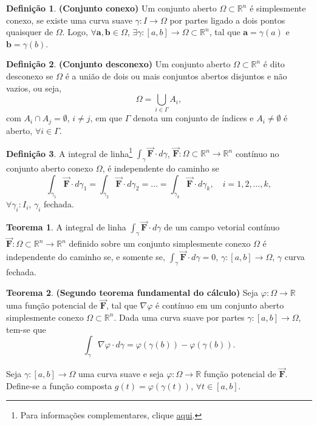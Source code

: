 \documentclass[11pt]{article}
\theoremstyle{definition}
\newtheorem{definicao}{Definição}
\newtheorem{teorema}{Teorema}
\begin{document}
	\begin{definicao} \textbf{(Conjunto conexo)}
		Um conjunto aberto $\Omega\subset \mathbb{R}^n$ é simplesmente conexo, se existe uma curva suave $\gamma:I \to \Omega$ por partes ligado a dois pontos quaisquer de $\Omega$. Logo, $\forall \boldsymbol{a}, \boldsymbol{b}  \in \Omega$, $\exists \gamma:[a,b] \to \Omega \subset \mathbb{R}^n$, tal que $\boldsymbol{a}=\gamma(a)$ e $\boldsymbol{b}=\gamma(b)$.
	\end{definicao}
	\begin{definicao} \textbf{(Conjunto desconexo)}
		Um conjunto aberto $\Omega \subset \mathbb{R}^n$ é dito desconexo se $\Omega$ é a união de dois ou mais conjuntos abertos disjuntos e não vazios, ou seja,
		\begin{equation*}
			\Omega=\bigcup_{i \in \Gamma}A_i,
		\end{equation*}
		com $A_i\cap A_j = \emptyset$, $i \neq j$, em que $\Gamma$ denota um conjunto de índices e $A_i\neq \emptyset$ é aberto, $\forall i \in \Gamma$.
	\end{definicao}
	\begin{definicao}
		A integral de linha\footnote{Para informações complementares, clique \href{https://github.com/caio-nicacio/studyNotes/blob/main/calculus-topics/line-integrals/line-integrals.pdf}{aqui}.} $\int_{\gamma} \vec{\boldsymbol{F}}\cdot d\gamma$, $\vec{\boldsymbol{F}}:\Omega \subset \mathbb{R}^n\to \mathbb{R}^n$ contínuo no conjunto aberto conexo $\Omega$, é independente do caminho se
		\begin{equation*}
			\int_{\gamma_1} \vec{\boldsymbol{F}}\cdot d\gamma_1=\int_{\gamma_2} \vec{\boldsymbol{F}}\cdot d\gamma_2=\dots=\int_{\gamma_k} \vec{\boldsymbol{F}}\cdot d\gamma_k,\quad i=1,2,\dots, k,
		\end{equation*}
		$\forall \gamma_i:I_i$, $\gamma_i$ fechada.
	\end{definicao}
	\begin{teorema}
		A integral de linha $\int_{\gamma}\vec{\boldsymbol{F}}\cdot d\gamma$ de um campo vetorial contínuo $\vec{\boldsymbol{F}}:\Omega\subset \mathbb{R}^n\to \mathbb{R}^n$ definido sobre um conjunto simplesmente conexo $\Omega$ é independente do caminho se, e somente se, $\int_{\gamma}\vec{\boldsymbol{F}}\cdot d\gamma=0$, $\gamma:[a,b]\to \Omega$, $\gamma$ curva fechada.
	\end{teorema}
	\begin{teorema} \label{thm:tfc2} \textbf{(Segundo teorema fundamental do cálculo)}
		Seja $\varphi:\Omega\to \mathbb{R}$ uma função potencial de $\vec{\boldsymbol{F}}$, tal que $\nabla \varphi$ é contínuo em um conjunto aberto simplesmente conexo $\Omega\subset \mathbb{R}^n$. Dada uma curva suave por partes $\gamma:[a,b]\to \Omega$, tem-se que
		\begin{equation*}
			\int_{\gamma}\nabla \varphi\cdot d\gamma = \varphi(\gamma(b))-\varphi(\gamma(b)).
		\end{equation*}
	\end{teorema}
	Seja $\gamma:[a,b]\to \Omega$ uma curva suave e seja $\varphi:\Omega\to \mathbb{R}$ função potencial de $\vec{\boldsymbol{F}}$. Define-se a função composta $g(t)=\varphi(\gamma(t))$, $\forall t\in [a,b]$.
	
\end{document}
